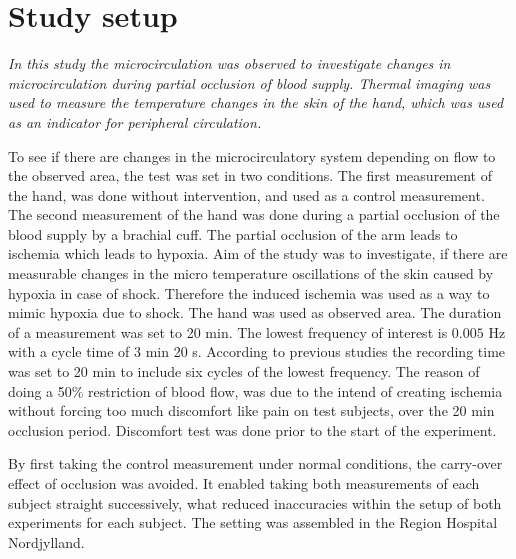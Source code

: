 \chapter{Study setup}

\textit{In this study the microcirculation was observed to investigate changes in microcirculation during partial occlusion of blood supply. Thermal imaging was used to measure the temperature changes in the skin of the hand, which was used as an indicator for peripheral circulation.} 


To see if there are changes in the microcirculatory system depending on flow to the observed area, the test was set in two conditions. The first measurement of the hand, was done without intervention, and used as a control measurement. The second measurement of the hand was done during a partial occlusion of the blood supply by a brachial cuff. The partial occlusion of the arm leads to ischemia which leads to hypoxia\cite{martini2012}. Aim of the study was to investigate, if there are measurable changes in the micro temperature oscillations of the skin caused by hypoxia in case of shock. Therefore the induced ischemia was used as a way to mimic hypoxia due to shock. The hand was used as observed area. 
The duration of a measurement was set to 20 min. The lowest frequency of interest is $0.005$ Hz with a cycle time of 3 min 20 s. According to previous studies the recording time was set to 20 min to include six cycles of the lowest frequency.\cite{sagaidachnyi2014}
The reason of doing a 50\% restriction of blood flow, was due to the intend of creating ischemia without forcing too much discomfort like pain on test subjects, over the 20 min occlusion period. Discomfort test was done prior to the start of the experiment.

By first taking the control measurement under normal conditions, the carry-over effect of occlusion was avoided. It enabled taking both measurements of each subject straight successively, what reduced inaccuracies within the setup of both experiments for each subject. The setting was assembled in the Region Hospital Nordjylland.